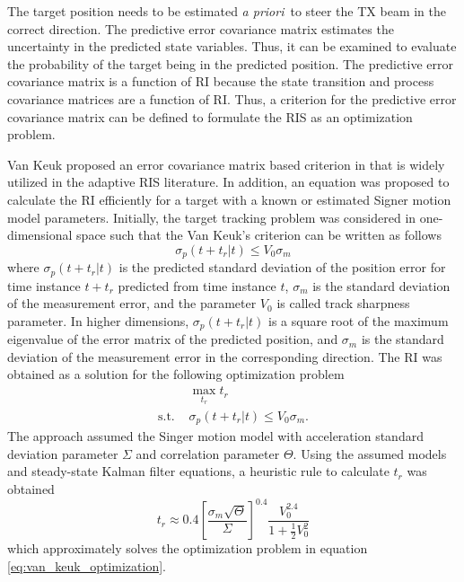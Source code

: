 \documentclass[english, 12pt, a4paper, elec, utf8, a-1b, online]{aaltothesis}
\def\prior{\textit{a priori}\ }
\newcommand{\ri}{t_r}
\begin{document}
\newcommand{\ndwells}{{n_d}}


The target position needs to be estimated \prior to steer the TX beam in the correct direction. 
The predictive error covariance matrix estimates the uncertainty in the predicted state variables.
Thus, it can be examined to evaluate the probability of the target being in the predicted position.
The predictive error covariance matrix is a function of RI because the state transition and process covariance matrices are a function of RI.
Thus, a criterion for the predictive error covariance matrix can be defined to formulate the RIS as an optimization problem.

Van Keuk proposed an error covariance matrix based criterion in \cite{Keuk1975} that is widely utilized in the adaptive RIS literature.
In addition, an equation was proposed to calculate the RI efficiently for a target with a known or estimated Signer motion model \cite{RongLi2003} parameters.
Initially, the target tracking problem was considered in one-dimensional space such that the Van Keuk's criterion can be written as follows
\begin{equation}\label{eq:criterion}
    \sigma_p(t + \ri | t) \leq V_0 \sigma_m
\end{equation}
where $\sigma_p(t + \ri | t)$ is the predicted standard deviation of the position error for time instance $t+\ri$ predicted from time instance $t$, $\sigma_m$ is the standard deviation of the measurement error, and the parameter $V_0$ is called track sharpness parameter.
In higher dimensions, $\sigma_p(t + \ri | t)$ is a square root of the maximum eigenvalue of the error matrix of the predicted position, and $\sigma_m$ is the standard deviation of the measurement error in the corresponding direction.
The RI was obtained as a solution for the following optimization problem
\begin{equation}\label{eq:van_keuk_optimization}
\begin{array}{ll}
     & \max_{\ri} \ri \\[7pt]
    \text{s.t. } &\sigma_p(t + \ri | t) \leq V_0 \sigma_m. 
\end{array}
\end{equation}
The approach assumed the Singer motion model with acceleration standard deviation parameter $\Sigma$ and correlation parameter $\Theta$.
Using the assumed models and steady-state Kalman filter equations, a heuristic rule to calculate $\ri$ was obtained
\begin{equation}\label{eq:keuk_time}
    \ri \approx 0.4 \left[ \frac{\sigma_m \sqrt{\Theta}}{\Sigma} \right]^{0.4} \frac{V_0^{2.4}}{1+\frac{1}{2}V_0^2}
\end{equation}
which approximately solves the optimization problem in equation \eqref{eq:van_keuk_optimization}.
\end{document}
